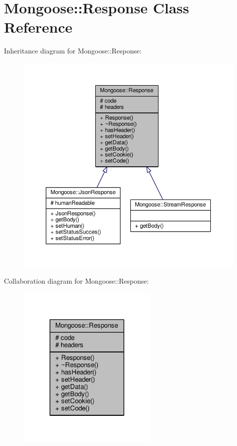 \hypertarget{classMongoose_1_1Response}{}\section{Mongoose\+:\+:Response Class Reference}
\label{classMongoose_1_1Response}


Inheritance diagram for Mongoose\+:\+:Response\+:
\nopagebreak
\begin{figure}[H]
\begin{center}
\leavevmode
\includegraphics[width=350pt]{d0/dfa/classMongoose_1_1Response__inherit__graph}
\end{center}
\end{figure}


Collaboration diagram for Mongoose\+:\+:Response\+:
\nopagebreak
\begin{figure}[H]
\begin{center}
\leavevmode
\includegraphics[width=192pt]{de/dd8/classMongoose_1_1Response__coll__graph}
\end{center}
\end{figure}
